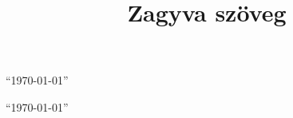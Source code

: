 \documentclass[]{article}
\begin{document}
\title{Zagyva szöveg}
\maketitle
\setlength{\parindent}{0pt}
\setlength{\parskip}{12pt}
\hulipsum[1-2]\par
``\today''\par
{}
\begin{raggedleft}
\blindtext[2]\par
``\today''\par
\end{raggedleft}\par
\begin{otherlanguage}{latin}
{\linespread{1.6}\selectfont
\lipsum[5-6]\par}
\end{otherlanguage}
\end{document}
